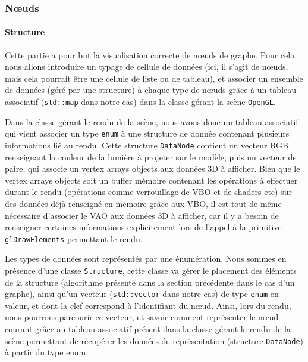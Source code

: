 \documentclass[a4paper, 11pt]{article}
\begin{document}
\subsubsection{Nœuds}
\paragraph{Structure}

Cette partie a pour but la visualisation correcte de nœuds de graphe. Pour cela, nous allons introduire un typage de cellule de données (ici, il s'agit de nœuds, mais cela pourrait être une cellule de liste ou de tableau), et associer un ensemble de données (géré par une structure) à chaque type de nœuds grâce à un tableau associatif (\texttt{std::map} dans notre cas) dans la classe gérant la scène \texttt{OpenGL}.

Dans la classe gérant le rendu de la scène, nous avons donc un tableau associatif qui vient associer un type \texttt{enum} à une structure de donnée contenant plusieurs informations lié au rendu. Cette structure \texttt{DataNode} contient un vecteur RGB renseignant la couleur de la lumière à projeter sur le modèle, puis un vecteur de paire, qui associe un vertex arrays objects aux données 3D à afficher. Bien que le vertex arrays objects soit un buffer mémoire contenant les opérations à effectuer durant le rendu (opérations comme verrouillage de VBO et de shaders etc) sur des données déjà renseigné en mémoire grâce aux VBO, il est tout de même nécessaire d'associer le VAO aux données 3D à afficher, car il y a besoin de renseigner certaines informations explicitement lors de l'appel à la primitive \texttt{glDrawElements} permettant le rendu.

Les types de données sont représentés par une énumération. Nous sommes en présence d'une classe \texttt{Structure}, cette classe va gérer le placement des éléments de la structure (algorithme présenté dans la section précédente dans le cas d'un graphe), ainsi qu'un vecteur (\texttt{std::vector} dans notre cas) de type \texttt{enum} en valeur, et dont la clef correspond à l'identifiant du nœud. Ainsi, lors du rendu, nous pourrons parcourir ce vecteur, et savoir comment représenter le nœud courant grâce au tableau associatif présent dans la classe gérant le rendu de la scène permettant de récupérer les données de représentation (structure \texttt{DataNode}) à partir du type enum.
\end{document}
